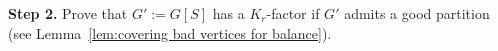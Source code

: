 \documentclass[11pt, a4paper]{article}
\theoremstyle{definition}
\newcommand{\<}{\subseteq}
\begin{document}



\medskip
{\bf Step 2.} Prove that $G':=G[S]$ has a  $K_r$-factor if $G'$ admits a good partition (see Lemma~\ref{lem:covering bad vertices for balance}).\medskip
\end{document}
